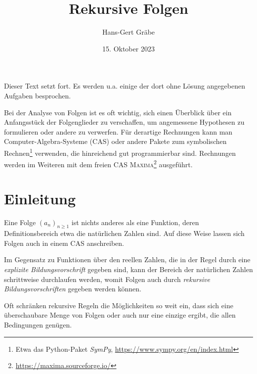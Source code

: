\documentclass[11pt,a4paper]{article}
\title{Rekursive Folgen}
\author{Hans-Gert Gräbe}
\date{15. Oktober 2023}
\newcommand{\cas}[1]{\textsc{#1}}
\begin{document}
\maketitle

Dieser Text setzt \cite{S} fort. Es werden u.a. einige der dort ohne Lösung
angegebenen Aufgaben besprochen. 

Bei der Analyse von Folgen ist es oft wichtig, sich einen Überblick über ein
Anfangsstück der Folgenglieder zu verschaffen, um angemessene Hypothesen zu
formulieren oder andere zu verwerfen.  Für derartige Rechnungen kann man
Computer-Algebra-Systeme (CAS) oder andere Pakete zum symbolischen
Rechnen\footnote{Etwa das Python-Paket \emph{SymPy},
\url{https://www.sympy.org/en/index.html} } verwenden, die hinreichend gut
programmierbar sind.  Rechnungen werden im Weiteren mit dem freien CAS
\cas{Maxima}\footnote{\url{https://maxima.sourceforge.io/}} ausgeführt.

\section*{Einleitung}

Eine Folge $(a_n)_{n\ge 1}$ ist nichts anderes als eine Funktion, deren
Definitionsbereich etwa die natürlichen Zahlen sind. Auf diese Weise lassen
sich Folgen auch in einem CAS anschreiben.

Im Gegensatz zu Funktionen über den reellen Zahlen, die in der Regel durch
eine \emph{explizite Bildungsvorschrift} gegeben sind, kann der Bereich der
natürlichen Zahlen schrittweise durchlaufen werden, womit Folgen auch durch
\emph{rekursive Bildungsvorschriften} gegeben werden können. 

Oft schränken rekursive Regeln die Möglichkeiten so weit ein, dass sich eine
überschaubare Menge von Folgen oder auch nur eine einzige ergibt, die allen
Bedingungen genügen. 
\end{document}

